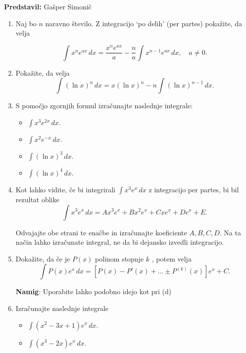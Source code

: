 \textbf{Predstavil:} Gašper Simonič

\begin{enumerate}

\item Naj bo $n$ naravno število.
Z integracijo `po delih' (per partes) pokažite, da velja
    
\[
\int x^n e^{ax} \,dx = \frac{x^n e^{ax}}{a} - \frac{n}{a} \int x^{n-1} e^{ax} \,dx, \quad a \neq 0.
\]
    
\item Pokažite, da velja
    \[
    \int (\ln x)^n \,dx = x (\ln x)^n - n \int (\ln x)^{n-1} \,dx. 
		\]
    
\item S pomočjo zgornjih formul izračunajte naslednje integrale:
			\begin{itemize}
				\item $\int x^3 e^{2x} \,dx.$ 
				\item $\int x^2 e^{-x} \,dx.$ 
				\item $\int (\ln x)^3 \,dx.$ 
				\item $\int (\ln x)^4 \,dx.$ 
			\end{itemize}
    
\item Kot lahko vidite, če bi integrirali  $\int x^3 e^x \,dx$  z integracijo per partes, bi bil rezultat oblike
		\[
    \int x^3 e^x \,dx = A x^3 e^x + B x^2 e^x + C x e^x + D e^x + E.  
		\]
    
   Odvajajte obe strani te enačbe in izračunajte koeficiente  $A, B, C, D$. Na ta način lahko izračunate integral, ne da bi dejansko izvedli integracijo.
    
\item Dokažite, da če je  $P(x)$  polinom stopnje  $k$ , potem velja
		\[
    \int P(x) e^x \,dx = [P(x) - P'(x) + \dots \pm P^{(k)}(x)] e^x + C.
		\]
    
    \textbf{Namig}: Uporabite lahko podobno idejo kot pri (d)
    
\item Izračunajte naslednje integrale
	\begin{itemize}    
     \item $\int (x^2 - 3x + 1)e^x \,dx.$ 
     \item $\int (x^3 - 2x)e^x \,dx.$
  \end{itemize}
\end{enumerate}
